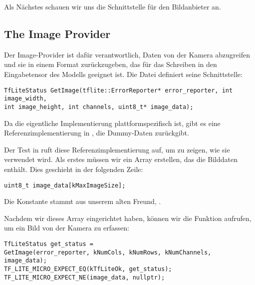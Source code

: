 Als Nächstes schauen wir uns die Schnittstelle für den Bildanbieter an.



\subsection{The Image Provider}

Der Image-Provider ist dafür verantwortlich, Daten von der Kamera abzugreifen und sie in einem Format zurückzugeben, das für das Schreiben in den Eingabetensor des Modells geeignet ist. Die Datei  definiert seine Schnittstelle:

\begin{code}
    \begin{lstlisting}
TfLiteStatus GetImage(tflite::ErrorReporter* error_reporter, int image_width,
int image_height, int channels, uint8_t* image_data);
  \end{lstlisting}
\end{code}

Da die eigentliche Implementierung plattformspezifisch ist, gibt es eine Referenzimplementierung in , die Dummy-Daten zurückgibt.

Der Test in  ruft diese Referenzimplementierung auf, um zu zeigen, wie sie verwendet wird. Als erstes müssen wir ein Array erstellen, das die Bilddaten enthält. Dies geschieht in der folgenden Zeile:

\begin{code}
    \begin{lstlisting}
uint8_t image_data[kMaxImageSize];
  \end{lstlisting}
\end{code}

Die Konstante  stammt aus unserem alten Freund, .

Nachdem wir dieses Array eingerichtet haben, können wir die Funktion  aufrufen, um ein Bild von der Kamera zu erfassen:

\begin{code}
    \begin{lstlisting}
TfLiteStatus get_status =
GetImage(error_reporter, kNumCols, kNumRows, kNumChannels, image_data);
TF_LITE_MICRO_EXPECT_EQ(kTfLiteOk, get_status);
TF_LITE_MICRO_EXPECT_NE(image_data, nullptr);
  \end{lstlisting}
\end{code}

